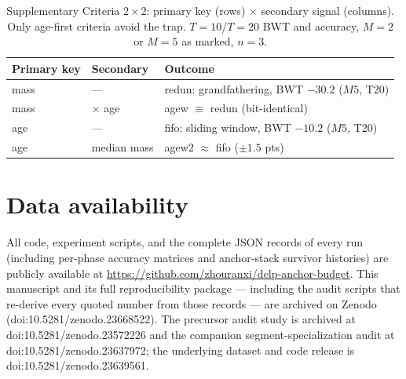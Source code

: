 \documentclass[11pt]{article}
\begin{document}
\begin{table}[htbp]
\centering\small
\caption{Supplementary Criteria $2{\times}2$: primary key (rows) $\times$ secondary
signal (columns). Only age-first criteria avoid the trap.
$T{=}10$/$T{=}20$ BWT and accuracy, $M{=}2$ or $M{=}5$ as marked,
$n{=}3$.}
\label{tab:supp-criteria}
\begin{tabular}{lll}
\toprule
Primary key & Secondary & Outcome \\
\midrule
mass  & ---   & redun: grandfathering, BWT $-30.2$ ($M5$, T20) \\
mass  & $\times$ age & agew $\equiv$ redun (bit-identical) \\
age   & ---   & fifo: sliding window, BWT $-10.2$ ($M5$, T20) \\
age   & median mass & agew2 $\approx$ fifo ($\pm1.5$ pts) \\
\bottomrule
\end{tabular}
\end{table}

\section*{Data availability}
All code, experiment scripts, and the complete JSON records of every
run (including per-phase accuracy matrices and anchor-stack survivor
histories) are publicly available at
\url{https://github.com/zhouranxi/delp-anchor-budget}. This manuscript
and its full reproducibility package --- including the audit scripts
that re-derive every quoted number from those records --- are archived
on Zenodo (doi:10.5281/zenodo.23668522). The precursor audit study is
archived at doi:10.5281/zenodo.23572226 and the companion
segment-specialization audit at doi:10.5281/zenodo.23637972; the
underlying dataset and code release is
doi:10.5281/zenodo.23639561.



\end{document}
